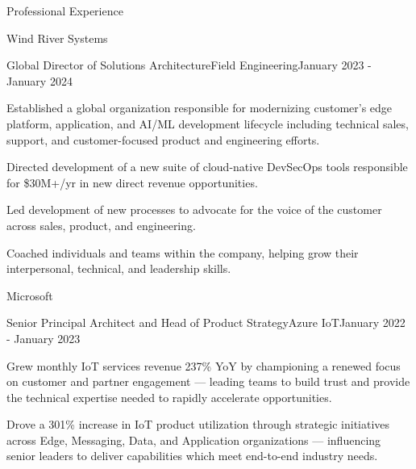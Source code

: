 \documentclass{resume} %
\begin{document}
\begin{rSection}{Professional Experience}
\begin{rCompany}{Wind River Systems}{}{}
    \begin{rSubSubsection}{Global Director of Solutions Architecture}{Field Engineering}{January 2023 - January 2024}
      \item Established a global organization responsible for modernizing customer's edge platform, application, and AI/ML development lifecycle including technical sales, support, and customer-focused product and engineering efforts.
      \item Directed development of a new suite of cloud-native DevSecOps tools responsible for \$30M+/yr in new direct revenue opportunities.
      \item Led development of new processes to advocate for the voice of the customer across sales, product, and engineering.
      \item Coached individuals and teams within the company, helping grow their interpersonal, technical, and leadership skills.
    \end{rSubSubsection}
  \end{rCompany}

  \begin{rCompany}{Microsoft}{}{}

     \begin{rSubSubsection}{Senior Principal Architect and Head of Product Strategy}{Azure IoT}{January 2022 - January 2023}
        \item Grew monthly IoT services revenue 237\% YoY by championing a renewed focus on customer and partner engagement --- leading teams to build trust and provide the technical expertise needed to rapidly accelerate opportunities.
        \item Drove a 301\% increase in IoT product utilization through strategic initiatives across Edge, Messaging, Data, and Application organizations --- influencing senior leaders to deliver capabilities which meet end-to-end industry needs.


\end{rSubSubsection}
\end{rCompany}
\end{rSection}
\end{document}
